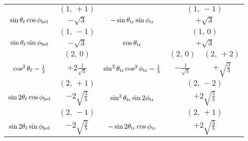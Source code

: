 \begin{table}[p]
\begin{tabular}{| c | c c c c c c || c | c c c c c c |}
                                &  \multicolumn{6}{c||}{$(1,\,+1)$}  &
                                &  \multicolumn{6}{c|}{$(1,\,-1)$}   \\
    \cline{2-7}\cline{9-14}
    $\sin\theta_\ell \cos\phi_\text{hel}$   &  \multicolumn{6}{c||}{$-\sqrt{3}$}  &
    $-\sin\theta_\text{tr} \sin\phi_\text{tr}$  &  \multicolumn{6}{c|}{$+\sqrt{3}$}   \\
    \hline

                               &  \multicolumn{6}{c||}{$(1,\,-1)$}   &
                               &  \multicolumn{6}{c|}{$(1,\,0)$}  \\
    \cline{2-7}\cline{9-14}
    $\sin\theta_\ell \sin\phi_\text{hel}$  &  \multicolumn{6}{c||}{$-\sqrt{3}$}   &
    $\cos\theta_\text{tr}$             &  \multicolumn{6}{c|}{$+\sqrt{3}$}    \\
    \hline

                                                 &  \multicolumn{6}{c||}{$(2,\,0)$}          &
                                                 &  \multicolumn{3}{c|}{$(2,\,0)$}
                                                 &  \multicolumn{3}{c|}{$(2,\,+2)$}             \\
    \cline{2-7}\cline{9-14}
    $\cos^2\theta_\ell - \frac{1}{3}$                &  \multicolumn{6}{c||}{$+2\frac{1}{\sqrt{5}}$} &
    $\sin^2\theta_\text{tr} \cos^2\phi_\text{tr} - \frac{1}{3}$  &  \multicolumn{3}{c|}{$-\frac{1}{\sqrt{5}}$}
                                                 &  \multicolumn{3}{c|}{$+\sqrt{\frac{3}{5}}$}   \\
    \hline

                                  &  \multicolumn{6}{c||}{$(2,\,+1)$}             &
                                  &  \multicolumn{6}{c|}{$(2,\,-2)$}              \\
    \cline{2-7}\cline{9-14}
    $\sin2\theta_\ell \cos\phi_\text{hel}$    &  \multicolumn{6}{c||}{$-2\sqrt{\frac{3}{5}}$}  &
    $\sin^2\theta_\text{tr} \sin2\phi_\text{tr}$  &  \multicolumn{6}{c|}{$+2\sqrt{\frac{3}{5}}$}   \\
    \hline

                                 &  \multicolumn{6}{c||}{$(2,\,-1)$}             &
                                 &  \multicolumn{6}{c|}{$(2,\,+1)$}              \\
    \cline{2-7}\cline{9-14}
    $\sin2\theta_\ell \sin\phi_\text{hel}$   &  \multicolumn{6}{c||}{$-2\sqrt{\frac{3}{5}}$}  &
    $-\sin2\theta_\text{tr} \cos\phi_\text{tr}$  &  \multicolumn{6}{c|}{$+2\sqrt{\frac{3}{5}}$}   \\
    \hline


\end{tabular}
\end{table}
